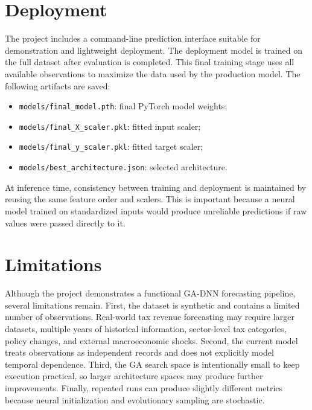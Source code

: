 \documentclass[conference]{IEEEtran}
\begin{document}
\section{Deployment}
The project includes a command-line prediction interface suitable for demonstration and lightweight deployment. The deployment model is trained on the full dataset after evaluation is completed. This final training stage uses all available observations to maximize the data used by the production model. The following artifacts are saved:
\begin{itemize}
    \item \texttt{models/final\_model.pth}: final PyTorch model weights;
    \item \texttt{models/final\_X\_scaler.pkl}: fitted input scaler;
    \item \texttt{models/final\_y\_scaler.pkl}: fitted target scaler;
    \item \texttt{models/best\_architecture.json}: selected architecture.
\end{itemize}

At inference time, consistency between training and deployment is maintained by reusing the same feature order and scalers. This is important because a neural model trained on standardized inputs would produce unreliable predictions if raw values were passed directly to it.

\section{Limitations}
Although the project demonstrates a functional GA-DNN forecasting pipeline, several limitations remain. First, the dataset is synthetic and contains a limited number of observations. Real-world tax revenue forecasting may require larger datasets, multiple years of historical information, sector-level tax categories, policy changes, and external macroeconomic shocks. Second, the current model treats observations as independent records and does not explicitly model temporal dependence. Third, the GA search space is intentionally small to keep execution practical, so larger architecture spaces may produce further improvements. Finally, repeated runs can produce slightly different metrics because neural initialization and evolutionary sampling are stochastic.
\end{document}
